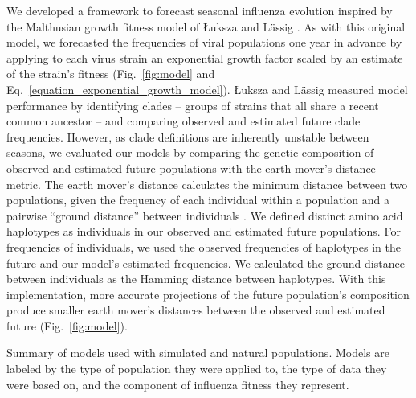 We developed a framework to forecast seasonal influenza evolution inspired by the Malthusian growth fitness model of {\L}uksza and L\"assig \cite{Luksza:2014hj}.
As with this original model, we forecasted the frequencies of viral populations one year in advance by applying to each virus strain an exponential growth factor scaled by an estimate of the strain's fitness (Fig.~\ref{fig:model} and Eq.~\ref{equation_exponential_growth_model}).
{\L}uksza and L\"assig \cite{Luksza:2014hj} measured model performance by identifying clades -- groups of strains that all share a recent common ancestor -- and comparing observed and estimated future clade frequencies.
However, as clade definitions are inherently unstable between seasons, we evaluated our models by comparing the genetic composition of observed and estimated future populations with the earth mover's distance metric.
The earth mover's distance calculates the minimum distance between two populations, given the frequency of each individual within a population and a pairwise ``ground distance'' between individuals \cite{Rubner1998}.
We defined distinct amino acid haplotypes as individuals in our observed and estimated future populations.
For frequencies of individuals, we used the observed frequencies of haplotypes in the future and our model's estimated frequencies.
We calculated the ground distance between individuals as the Hamming distance between haplotypes.
With this implementation, more accurate projections of the future population's composition produce smaller earth mover's distances between the observed and estimated future (Fig.~\ref{fig:model}).

\begin{table}[htb]
  \begin{center}
    \scalebox{0.7}{
      
    }
    \caption{
      Summary of models used with simulated and natural populations.
      Models are labeled by the type of population they were applied to, the type of data they were based on, and the component of influenza fitness they represent.
    }
    \label{table_model_summary}
  \end{center}
\end{table}

